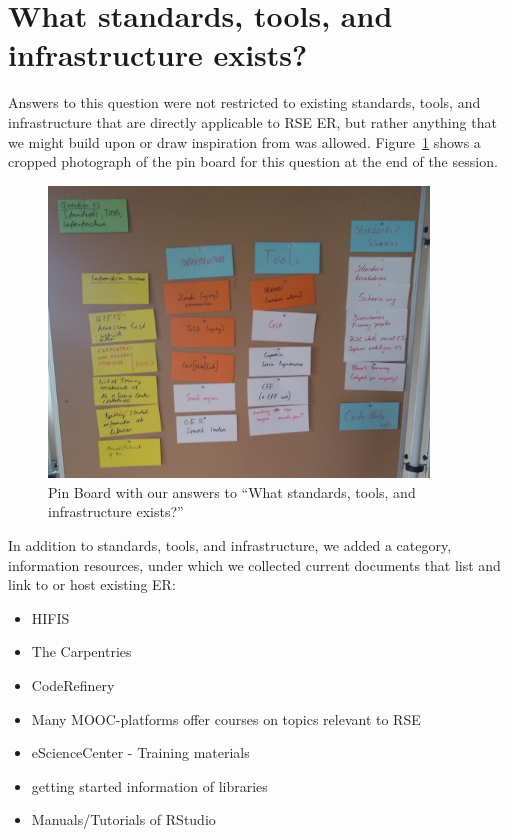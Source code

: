 \documentclass{scrartcl}
\begin{document}
\section*{What standards, tools, and infrastructure exists?}

Answers to this question were not restricted to existing standards, tools, and infrastructure that are directly applicable to RSE ER, but rather anything that we might build upon or draw inspiration from was allowed.
Figure~\ref{fig:existing} shows a cropped photograph of the pin board for this question at the end of the session.

\begin{figure}[h]
  \centering
  \includegraphics[width=0.9\textwidth]{existing}
  \caption{Pin Board with our answers to “What standards, tools, and infrastructure exists?”}\label{fig:existing}
\end{figure}

In addition to standards, tools, and infrastructure, we added a category, information resources, under which we collected current documents that list and link to or host existing ER:
\begin{itemize}
\item HIFIS \cite{HifisMaterial}
\item The Carpentries \cite{CCLessons, DCLessons, LCLessons, SWCLessons}
\item CodeRefinery \cite{CRLessons}
\item Many MOOC-platforms offer courses on topics relevant to RSE
\item eScienceCenter - Training materials \cite{eSSMaterial}
\item getting started information of libraries
\item Manuals/Tutorials of RStudio \cite{RSGuides}
\end{itemize}
\end{document}
